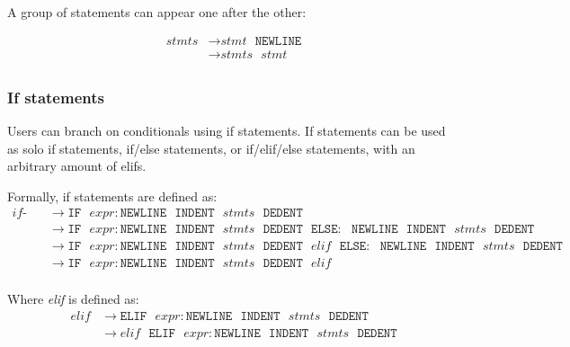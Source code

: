 \documentclass{article}
\begin{document}
A group of statements can appear one after the other:

\label{sec:stmts}
\begin{align*}
    \textit{stmts} &\to \hyperref[sec:stmt]{\textit{stmt}} \texttt{ } \texttt{NEWLINE} \\
    &\to \hyperref[sec:stmts]{\textit{stmts}} \texttt{ } \hyperref[sec:stmt]{\textit{stmt}}  \\
\end{align*}

\subsubsection{If statements}
Users can branch on conditionals using if statements. If statements can be used as solo if statements, if/else statements, or if/elif/else statements, with an arbitrary amount of elifs.

Formally, if statements are defined as:
\label{sec:if-stmt}
\begin{align*}
    \textit{if-stmt} &\to \texttt{IF} \texttt{ } \hyperref[sec:expr]{\textit{expr}}: \texttt{NEWLINE} \texttt{ } \texttt{INDENT} \texttt{ } \hyperref[sec:stmts]{\textit{stmts}} \texttt{ } \texttt{DEDENT} \\
    &\to \texttt{IF} \texttt{ } \hyperref[sec:expr]{\textit{expr}}: \texttt{NEWLINE} \texttt{ } \texttt{INDENT} \texttt{ } \hyperref[sec:stmts]{\textit{stmts}} \texttt{ } \texttt{DEDENT} \texttt{ } \texttt{ELSE}: \texttt{ } \texttt{NEWLINE} \texttt{ } \texttt{INDENT} \texttt{ } \hyperref[sec:stmts]{\textit{stmts}} \texttt{ } \texttt{DEDENT} \\
    &\to \texttt{IF} \texttt{ } \hyperref[sec:expr]{\textit{expr}}: \texttt{NEWLINE} \texttt{ } \texttt{INDENT} \texttt{ } \hyperref[sec:stmts]{\textit{stmts}} \texttt{ } \texttt{DEDENT} \texttt{ } \hyperref[sec:elif]{\textit{elif}} \texttt{ } \texttt{ELSE}: \texttt{ } \texttt{NEWLINE} \texttt{ } \texttt{INDENT} \texttt{ } \hyperref[sec:stmts]{\textit{stmts}} \texttt{ } \texttt{DEDENT} \\
    &\to \texttt{IF} \texttt{ } \hyperref[sec:expr]{\textit{expr}}: \texttt{NEWLINE} \texttt{ } \texttt{INDENT} \texttt{ } \hyperref[sec:stmts]{\textit{stmts}} \texttt{ } \texttt{DEDENT} \texttt{ } \hyperref[sec:elif]{\textit{elif}} \\
\end{align*}

\label{sec:elif}
Where \textit{elif} is defined as:
\begin{align*}
    \textit{elif} &\to \texttt{ELIF} \texttt{ } \hyperref[sec:expr]{\textit{expr}}: \texttt{NEWLINE} \texttt{ } \texttt{INDENT} \texttt{ } \hyperref[sec:stmts]{\textit{stmts}} \texttt{ } \texttt{DEDENT} \\
    &\to \hyperref[sec:elif]{\textit{elif}} \texttt{ } \texttt{ELIF} \texttt{ } \hyperref[sec:expr]{\textit{expr}}: \texttt{NEWLINE} \texttt{ } \texttt{INDENT} \texttt{ } \hyperref[sec:stmts]{\textit{stmts}} \texttt{ } \texttt{DEDENT} \\
\end{align*}
\end{document}
